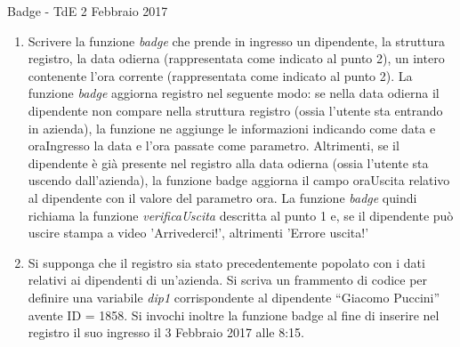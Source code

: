 \documentclass[format=169, 10pt]{beamer}
\begin{document}
\begin{frame}[allowframebreaks]{Badge - TdE 2 Febbraio 2017}
\begin{enumerate}
\item Scrivere la funzione \emph{badge} che prende in ingresso un dipendente, la struttura registro, la data
odierna (rappresentata come indicato al punto 2), un intero contenente l’ora corrente (rappresentata
come indicato al punto 2).
La funzione \emph{badge} aggiorna registro nel seguente modo: se nella data odierna il dipendente non
compare nella struttura registro (ossia l’utente sta entrando in azienda), la funzione ne aggiunge le
informazioni indicando come data e oraIngresso la data e l’ora passate come parametro.
Altrimenti, se il dipendente è già presente nel registro alla data odierna (ossia l’utente sta uscendo
dall'azienda), la funzione badge aggiorna il campo oraUscita relativo al dipendente con il valore
del parametro ora. La funzione \emph{badge} quindi richiama la funzione \emph{verificaUscita} descritta al punto 1 e, se il dipendente può uscire stampa a video 'Arrivederci!', altrimenti 'Errore uscita!'

\item  Si supponga che il registro sia stato precedentemente popolato con i dati relativi ai dipendenti di
un'azienda. Si scriva un frammento di codice per definire una variabile \emph{dip1} corrispondente al
dipendente “Giacomo Puccini” avente ID = 1858. Si invochi inoltre la funzione badge al fine di
inserire nel registro il suo ingresso il 3 Febbraio 2017 alle 8:15.
\end{enumerate} 
\end{frame}
\end{document}
